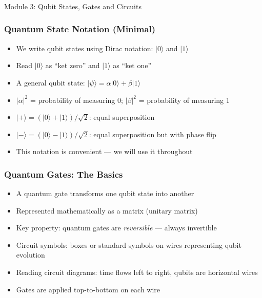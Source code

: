 
\begin{frame}[fragile]\frametitle{}
\begin{center}
{\Large Module 3: Qubit States, Gates and Circuits}
\end{center}
\end{frame}

\begin{frame}[fragile]\frametitle{Quantum State Notation (Minimal)}
\begin{itemize}
\item We write qubit states using Dirac notation: $|0\rangle$ and $|1\rangle$
\item Read $|0\rangle$ as ``ket zero'' and $|1\rangle$ as ``ket one''
\item A general qubit state: $|\psi\rangle = \alpha|0\rangle + \beta|1\rangle$
\item $|\alpha|^2$ = probability of measuring 0; $|\beta|^2$ = probability of measuring 1
\item $|+\rangle = (|0\rangle + |1\rangle)/\sqrt{2}$: equal superposition
\item $|-\rangle = (|0\rangle - |1\rangle)/\sqrt{2}$: equal superposition but with phase flip
\item This notation is convenient --- we will use it throughout
\end{itemize}
\end{frame}

\begin{frame}[fragile]\frametitle{Quantum Gates: The Basics}
\begin{itemize}
\item A quantum gate transforms one qubit state into another
\item Represented mathematically as a matrix (unitary matrix)
\item Key property: quantum gates are \textit{reversible} --- always invertible
\item Circuit symbols: boxes or standard symbols on wires representing qubit evolution
\item Reading circuit diagrams: time flows left to right, qubits are horizontal wires
\item Gates are applied top-to-bottom on each wire
\end{itemize}
\end{frame}

